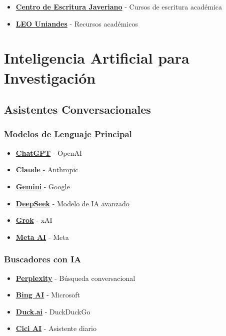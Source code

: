 \documentclass[
  jou,
  floatsintext,
  longtable,
  a4paper,
  nolmodern,
  notxfonts,
  notimes,
  12pt,
  colorlinks=true,linkcolor=blue,citecolor=blue,urlcolor=blue]{apa7}
\providecommand{\tightlist}{%
  \setlength{\itemsep}{0pt}\setlength{\parskip}{0pt}}
\begin{document}
\begin{itemize}
\tightlist
\item
  \textbf{\href{https://centrodeescriturajaveriano.thinkific.com/enrollments}{Centro
  de Escritura Javeriano}} - Cursos de escritura académica
\item
  \textbf{\href{https://leo.uniandes.edu.co/}{LEO Uniandes}} - Recursos
  académicos
\end{itemize}

\section{Inteligencia Artificial para
Investigación}\label{inteligencia-artificial-para-investigaciuxf3n}

\subsection{Asistentes
Conversacionales}\label{asistentes-conversacionales}

\subsubsection{Modelos de Lenguaje
Principal}\label{modelos-de-lenguaje-principal}

\begin{itemize}
\tightlist
\item
  \textbf{\href{https://chat.openai.com/chat}{ChatGPT}} - OpenAI
\item
  \textbf{\href{https://claude.ai}{Claude}} - Anthropic
\item
  \textbf{\href{https://gemini.google.com/}{Gemini}} - Google
\item
  \textbf{\href{https://www.deepseek.com/}{DeepSeek}} - Modelo de IA
  avanzado
\item
  \textbf{\href{https://x.com/i/grok}{Grok}} - xAI
\item
  \textbf{\href{https://www.meta.ai/}{Meta AI}} - Meta
\end{itemize}

\subsubsection{Buscadores con IA}\label{buscadores-con-ia}

\begin{itemize}
\tightlist
\item
  \textbf{\href{https://www.perplexity.ai/}{Perplexity}} - Búsqueda
  conversacional
\item
  \textbf{\href{https://www.bing.com/search?q=Bing+AI&showconv=1}{Bing
  AI}} - Microsoft
\item
  \textbf{\href{https://duckduckgo.com/?q=DuckDuckGo+AI+Chat&ia=chat&duckai=1&atb=v463-1}{Duck.ai}}
  - DuckDuckGo
\item
  \textbf{\href{https://www.ciciai.com/chat/}{Cici AI}} - Asistente
  diario
\end{itemize}
\end{document}
